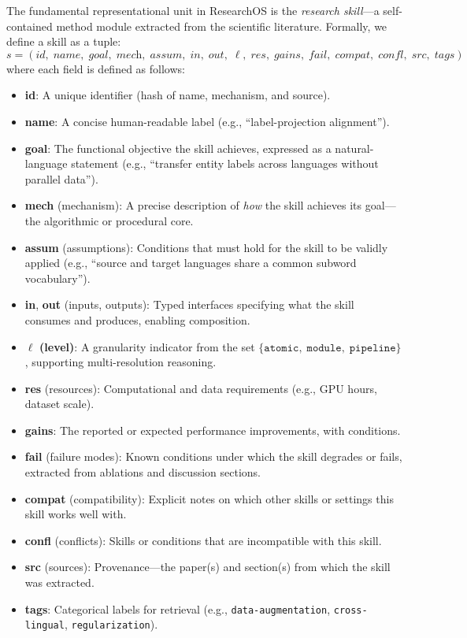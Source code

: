 The fundamental representational unit in ResearchOS is the \emph{research skill}---a self-contained method module extracted from the scientific literature. Formally, we define a skill as a tuple:
\begin{equation}
\label{eq:skill_tuple}
s = (\textit{id},\; \textit{name},\; \textit{goal},\; \textit{mech},\; \textit{assum},\; \textit{in},\; \textit{out},\; \ell,\; \textit{res},\; \textit{gains},\; \textit{fail},\; \textit{compat},\; \textit{confl},\; \textit{src},\; \textit{tags})
\end{equation}
where each field is defined as follows:

\begin{itemize}[leftmargin=1.2em,itemsep=2pt]
    \item \textbf{id}: A unique identifier (hash of name, mechanism, and source).
    \item \textbf{name}: A concise human-readable label (e.g., ``label-projection alignment'').
    \item \textbf{goal}: The functional objective the skill achieves, expressed as a natural-language statement (e.g., ``transfer entity labels across languages without parallel data'').
    \item \textbf{mech} (mechanism): A precise description of \emph{how} the skill achieves its goal---the algorithmic or procedural core.
    \item \textbf{assum} (assumptions): Conditions that must hold for the skill to be validly applied (e.g., ``source and target languages share a common subword vocabulary'').
    \item \textbf{in}, \textbf{out} (inputs, outputs): Typed interfaces specifying what the skill consumes and produces, enabling composition.
    \item $\boldsymbol{\ell}$ \textbf{(level)}: A granularity indicator from the set $\{\texttt{atomic},\; \texttt{module},\; \texttt{pipeline}\}$, supporting multi-resolution reasoning.
    \item \textbf{res} (resources): Computational and data requirements (e.g., GPU hours, dataset scale).
    \item \textbf{gains}: The reported or expected performance improvements, with conditions.
    \item \textbf{fail} (failure modes): Known conditions under which the skill degrades or fails, extracted from ablations and discussion sections.
    \item \textbf{compat} (compatibility): Explicit notes on which other skills or settings this skill works well with.
    \item \textbf{confl} (conflicts): Skills or conditions that are incompatible with this skill.
    \item \textbf{src} (sources): Provenance---the paper(s) and section(s) from which the skill was extracted.
    \item \textbf{tags}: Categorical labels for retrieval (e.g., \texttt{data-augmentation}, \texttt{cross-lingual}, \texttt{regularization}).
\end{itemize}

